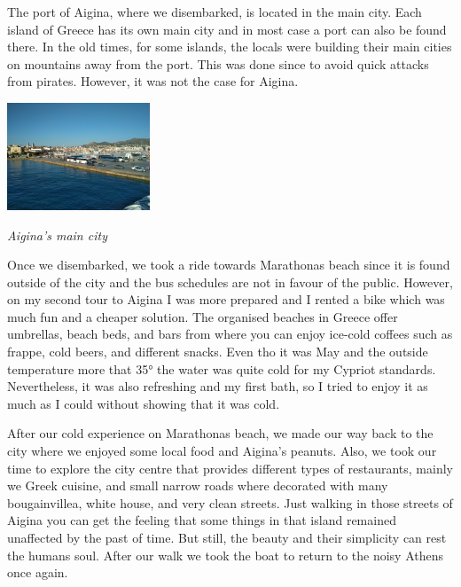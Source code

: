 \documentclass[10pt,a4paper]{article} %
\begin{document}
\begin{multicols}{3}
The port of Aigina, where we disembarked, is located in the main city. 
Each island of Greece has its own main city and in most case a port can also be 
found there. 
In the old times, for some islands, the locals were building their main cities 
on mountains away from the port. 
This was done since to avoid quick attacks from pirates. 
However, it was not the case for Aigina. 


\begin{center}
	\includegraphics[width=0.32\textwidth]{media/aigina_3.jpg}
	\par\textit{Aigina's main city}
\end{center}


Once we disembarked, we took a ride towards Marathonas beach since it is found 
outside of the city and the bus schedules are not in favour of the public. 
However, on my second tour to Aigina I was more prepared and I rented a bike which 
was much fun and a cheaper solution.
The organised beaches in Greece offer umbrellas, beach beds, and bars from where 
you can enjoy ice-cold coffees such as frappe, cold beers, and different snacks. 
Even tho it was May and the outside temperature more that \ang{35} the water was 
quite cold for my Cypriot standards. 
Nevertheless, it was also refreshing and my first bath, so I tried to enjoy it 
as much as I could without showing that it was cold. 


After our cold experience on Marathonas beach, we made our way back to the city 
where we enjoyed some local food and Aigina's peanuts. 
Also, we took our time to explore the city centre that provides different types of 
restaurants, mainly we Greek cuisine,  and small narrow roads where decorated with 
many bougainvillea, white house, and very clean streets. 
Just walking in those streets of Aigina you can get the feeling that some things 
in that island remained unaffected by the past of time. 
But still, the beauty and their simplicity can rest the humans soul. 
After our walk we took the boat to return to the noisy Athens once again.



\end{multicols}
\end{document}
